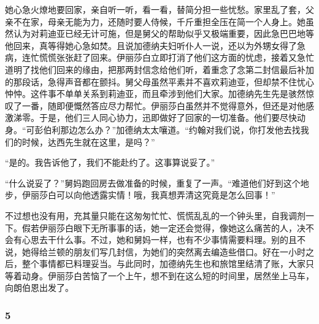 \par 她心急火燎地要回家，亲自听一听，看一看，替简分担一些忧愁。家里乱了套，父亲不在家，母亲无能为力，还随时要人侍候，千斤重担全压在简一个人身上。她虽然认为对莉迪亚已经无计可施，但是舅父的帮助似乎又极端重要，因此急巴巴地等他回来，真等得她心急如焚。且说加德纳夫妇听仆人一说，还以为外甥女得了急病，连忙慌慌张张赶了回来。伊丽莎白立即打消了他们这方面的忧虑，接着又急忙道明了找他们回来的缘由，把那两封信念给他们听，着重念了念第二封信最后补加的那段话，急得声音都在颤抖。舅父母虽然平素并不喜欢莉迪亚，但却禁不住忧心忡忡。这件事不单单关系到莉迪亚，而且牵涉到他们大家。加德纳先生先是骇然惊叹了一番，随即便慨然答应尽力帮忙。伊丽莎白虽然并不觉得意外，但还是对他感激涕零。于是，他们三人同心协力，迅即做好了回家的一切准备。他们要尽快动身。“可彭伯利那边怎么办？”加德纳太太嚷道。“约翰对我们说，你打发他去找我们的时候，达西先生就在这里，是吗？”
\par “是的。我告诉他了，我们不能赴约了。这事算说妥了。”
\par “什么说妥了？”舅妈跑回房去做准备的时候，重复了一声。“难道他们好到这个地步，伊丽莎白可以向他透露实情！哦，我真想弄清这究竟是怎么回事！”
\par 不过想也没有用，充其量只能在这匆匆忙忙、慌慌乱乱的一个钟头里，自我调剂一下。假若伊丽莎白眼下无所事事的话，她一定还会觉得，像她这么痛苦的人，决不会有心思去干什么事。不过，她和舅妈一样，也有不少事情需要料理。别的且不说，她得给兰顿的朋友们写几封信，为她们的突然离去编造些借口。好在一小时之后，整个事情都已料理妥当。与此同时，加德纳先生也和旅馆里结清了账，大家只等着动身。伊丽莎白苦恼了一个上午，想不到在这么短的时间里，居然坐上马车，向朗伯恩出发了。



\subsubsection*{5}

